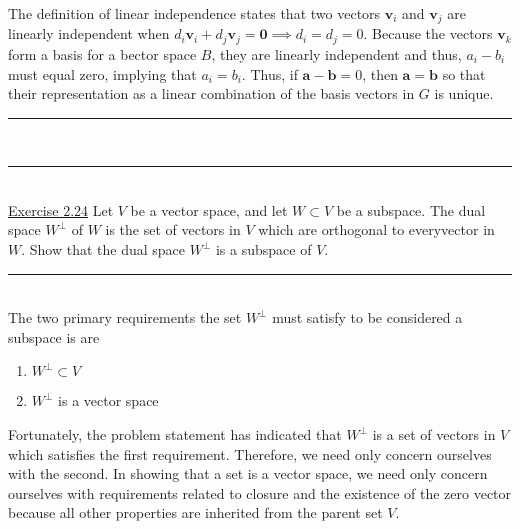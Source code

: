 \documentclass{article}
\newcommand{\problemsep}{\leavevmode\\[0.05in] \rule[\baselineskip/4]{\textwidth}{1pt} \\[0.005in] \rule[\baselineskip]{\textwidth}{1pt}\vspace{-\baselineskip}\leavevmode\\[0.05in]}
\newcommand{\statementsep}{\leavevmode\\[0.005in] \rule[\baselineskip/4]{\textwidth}{0.4pt}\leavevmode\\[0.005in]}
\begin{document}
The definition of linear independence states that two vectors $\mathbf{v}_i$ and $\mathbf{v}_j$ are linearly independent when $d_i\mathbf{v}_i + d_j\mathbf{v}_j = \mathbf{0} \implies d_i = d_j = 0$. Because the vectors $\mathbf{v}_k$ form a basis for a bector space $B$, they are linearly independent and thus, $a_i - b_i$ must equal zero, implying that $a_i = b_i$. Thus, if $\mathbf{a} - \mathbf{b} = 0$, then $\mathbf{a} = \mathbf{b}$ so that their representation as a linear combination of the basis vectors in $G$ is unique.
\problemsep
\noindent\underline{Exercise 2.24}
Let $V$ be a vector space, and let $W \subset V$ be a subspace. The dual space $W^{\perp}$ of $W$ is the set of vectors in $V$ which are orthogonal to everyvector in $W$. Show that the dual space $W^{\perp}$ is a subspace of $V$.  
\statementsep
The two primary requirements the set $W^{\perp}$ must satisfy to be considered a subspace is are
\begin{enumerate}
	\item $W^{\perp} \subset V$
	\item $W^{\perp}$ is a vector space
\end{enumerate}
Fortunately, the problem statement has indicated that $W^{\perp}$ is a set of vectors in $V$ which satisfies the first requirement. Therefore, we need only concern ourselves with the second. In showing that a set is a vector space, we need only concern ourselves with requirements related to closure and the existence of the zero vector because all other properties are inherited from the parent set $V$. 
\end{document}
